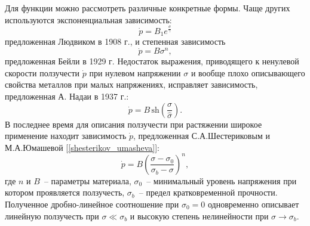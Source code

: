 Для функции  можно рассмотреть различные конкретные формы. Чаще других используются экспоненциальная зависимость:
\begin{equation} 
	\dot{p} = B_1e^{\frac{\sigma}{\gamma}}
\end{equation}
предложенная Людвиком в 1908 г., и степенная зависимость
\begin{equation} 
	\dot{p} = B\sigma^n,
\end{equation}
предложенная Бейли в 1929 г. Недостаток выражения, приводящего к ненулевой скорости ползучести $\dot{p}$ при нулевом напряжении $\sigma$ и вообще плохо описывающего свойства металлов при малых напряжениях, исправляет зависимость, предложенная А. Надаи в 1937 г.:
\begin{equation}
	\dot{p} = B\, \text{sh}(\dfrac{\sigma}{\widehat{\sigma}}).
\end{equation}
В последнее время для описания ползучести при растяжении широкое применение находит зависимость $\dot{p}$, предложенная С.А.Шестериковым и М.А.Юмашевой [\ref{shesterikov_umasheva}]:
\begin{equation}
	\dot{p} = B\left(\dfrac{\sigma-\sigma_0}{\sigma_b-\sigma}\right)^n,
\end{equation}
где $n$ и $B$~-- параметры материала, $\sigma_0$~-- минимальный уровень напряжения при котором проявляется ползучесть, $\sigma_b$~-- предел кратковременной прочности.
Полученное дробно-линейное соотношение при $\sigma_0 = 0$ одновременно описывает линейную ползучесть при $\sigma \ll \sigma_b$ и высокую степень нелинейности при $\sigma \to \sigma_b$.
